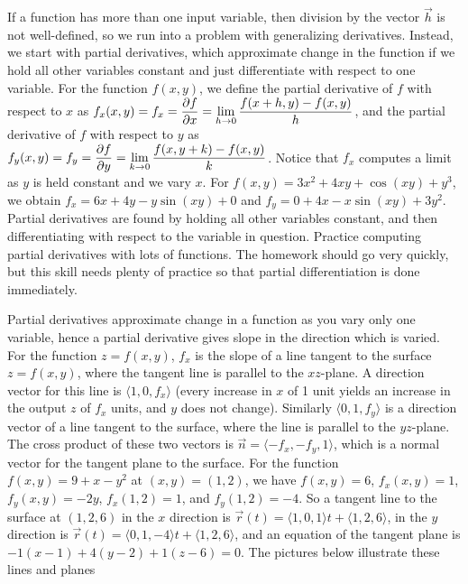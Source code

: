 If a function has more than one input variable, then division by the
vector $\vec h$ is not well-defined, so we run into a problem with
generalizing derivatives.  Instead, we start with partial derivatives,
which approximate change in the function if we hold all other
variables constant and just differentiate with respect to one
variable.  For the function $f(x,y)$, we define the partial derivative
of $f$ with respect to $x$ as $\displaystyle f_x(x,y)=f_x = \frac{\partial f}{\partial x}=
\lim_{h\to 0}\frac{f(x+h,y)-f(x,y)}{h}$, and the partial derivative of
$f$ with respect to $y$ as $\displaystyle f_y(x,y)=f_y =\frac{\partial f}{\partial y}=
\lim_{k\to 0}\frac{f(x,y+k)-f(x,y)}{k}$. Notice that $f_x$ computes a
limit as $y$ is held constant and we vary $x$. For
$f(x,y)=3x^2+4xy+\cos(xy)+y^3$, we obtain $f_x=6x+4y-y\sin(xy)+0$ and
$f_y=0+4x-x\sin(xy)+3y^2$. Partial derivatives are found by holding
all other variables constant, and then differentiating with respect to
the variable in question. Practice computing partial derivatives with
lots of functions. The homework should go very quickly, but this skill
needs plenty of practice so that partial differentiation is done
immediately.

Partial derivatives approximate change in a function as you vary only
one variable, hence a partial derivative gives slope in the direction
which is varied. For the function $z=f(x,y)$, $f_x$ is the slope of a
line tangent to the surface $z=f(x,y)$, where the tangent line is
parallel to the $xz$-plane. A direction vector for this line is
$\langle1,0,f_x\rangle$ (every increase in $x$ of 1 unit yields an
increase in the output $z$ of $f_x$ units, and $y$ does not change). 
Similarly $\langle0,1,f_y\rangle$ is a direction vector of a line
tangent to the surface, where the line is parallel to the $yz$-plane.
The cross product of these two vectors is $\vec n =
\langle-f_x,-f_y,1\rangle$, which is a normal vector for the tangent
plane to the surface. For the function $f(x,y)=9+x-y^2$ at
$(x,y)=(1,2)$, we have $f(x,y)=6$, $f_x(x,y) =1$, $f_y(x,y)=-2y$,
$f_x(1,2)=1$, and $f_y(1,2)=-4$. So a tangent line to the surface at
$(1,2,6)$ in the $x$ direction is $\vec r(t) = \langle1,0,1\rangle t+ 
\langle1,2,6\rangle$, in the $y$ direction is $\vec r(t) =
\langle0,1,-4\rangle t+  \langle1,2,6\rangle$, and an equation of the
tangent plane is $-1(x-1)+4(y-2)+1(z-6)=0$. The pictures below
illustrate these lines and planes 


